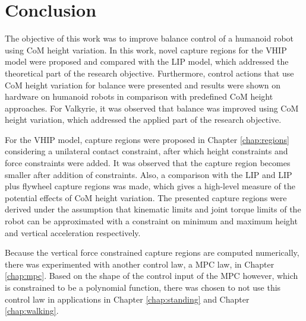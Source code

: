 %
\chapter{Conclusion}\label{chap:conclusion}
The objective of this work was to improve balance control of a humanoid robot using \ac{CoM} height variation. In this work, novel capture regions for the \ac{VHIP} model were proposed and compared with the \ac{LIP} model, which addressed the theoretical part of the research objective. Furthermore, control actions that use \ac{CoM} height variation for balance were presented and results were shown on hardware on humanoid robots in comparison with predefined \ac{CoM} height approaches. For Valkyrie, it was observed that balance was improved using \ac{CoM} height variation, which addressed the applied part of the research objective. 

For the \ac{VHIP} model, capture regions were proposed in Chapter \ref{chap:regions} considering a unilateral contact constraint, after which height constraints and force constraints were added. It was observed that the capture region becomes smaller after addition of constraints. Also, a comparison with the \ac{LIP} and \ac{LIP} plus flywheel capture regions was made, which gives a high-level measure of the potential effects of \ac{CoM} height variation. The presented capture regions were derived under the assumption that kinematic limits and joint torque limits of the robot can be approximated with a constraint on minimum and maximum height and vertical acceleration respectively. 

Because the vertical force constrained capture regions are computed numerically, there was experimented with another control law, a \ac{MPC} law, in Chapter \ref{chap:mpc}. Based on the shape of the control input of the \ac{MPC} however, which is constrained to be a polynomial function, there was chosen to not use this control law in applications in Chapter \ref{chap:standing} and Chapter \ref{chap:walking}.

